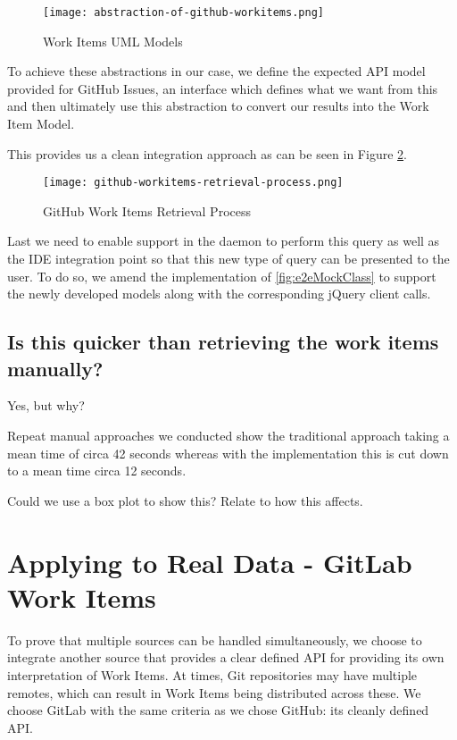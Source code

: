 \begin{figure}[h!]
	\centering
	\texttt{[image: abstraction-of-github-workitems.png]}
	\caption{Work Items UML Models}
	\label{fig:abstractionOfGitHubWorkItems}
\end{figure}

To achieve these abstractions in our case, we define the expected API model provided for GitHub Issues, an interface which defines what we want from this and then ultimately use this abstraction to convert our results into the Work Item Model.

This provides us a clean integration approach as can be seen in Figure \ref{fig:gitHubworkItemsRetrievalProcess}.

\begin{figure}[h!]
	\centering
	\texttt{[image: github-workitems-retrieval-process.png]}
	\caption{GitHub Work Items Retrieval Process}
	\label{fig:gitHubworkItemsRetrievalProcess}
\end{figure}

Last we need to enable support in the daemon to perform this query as well as the IDE integration point so that this new type of query can be presented to the user. To do so, we amend the implementation of \ref{fig:e2eMockClass} to support the newly developed models along with the corresponding jQuery client calls.

\subsection{Is this quicker than retrieving the work items manually?}

Yes, but why?

Repeat manual approaches we conducted show the traditional approach taking a mean time of circa 42 seconds whereas with the implementation this is cut down to a mean time circa 12 seconds. 

Could we use a box plot to show this? Relate to how this affects.

\section{Applying to Real Data - GitLab Work Items}

To prove that multiple sources can be handled simultaneously, we choose to integrate another source that provides a clear defined API for providing its own interpretation of Work Items. At times, Git repositories may have multiple remotes, which can result in Work Items being distributed across these. We choose GitLab with the same criteria as we chose GitHub: its cleanly defined API.

